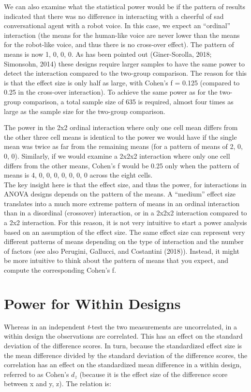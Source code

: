 \documentclass[,man,floatsintext]{apa6}
\begin{document}
We can also examine what the statistical power would be if the pattern
of results indicated that there was no difference in interacting with a
cheerful of sad conversational agent with a robot voice. In this case,
we expect an \enquote{ordinal} interaction (the means for the human-like
voice are never lower than the means for the robot-like voice, and thus
there is no cross-over effect). The pattern of means is now 1, 0, 0, 0.
As has been pointed out (Giner-Sorolla, 2018; Simonsohn, 2014) these
designs require larger samples to have the same power to detect the
interaction compared to the two-group comparison. The reason for this is
that the effect size is only half as large, with Cohen's f = 0.125
(compared to 0.25 in the cross-over interaction). To achieve the same
power as for the two-group comparison, a total sample size of 635 is
required, almost four times as large as the sample size for the
two-group comparison.

The power in the 2x2 ordinal interaction where only one cell mean
differs from the other three cell means is identical to the power we
would have if the single mean was twice as far from the remaining means
(for a pattern of means of 2, 0, 0, 0). Similarly, if we would examine a
2x2x2 interaction where only one cell differs from the other means,
Cohen's f would be 0.25 only when the pattern of means is 4, 0, 0, 0, 0,
0, 0, 0 across the eight cells.\\
The key insight here is that the effect size, and thus the power, for
interactions in ANOVA designs depends on the pattern of the means. A
\enquote{medium} effect size translates into a much more extreme pattern
of means in an ordinal interaction than in a disordinal (crossover)
interaction, or in a 2x2x2 interaction compared to a 2x2 interaction.
For this reason, it is not very intuitive to start a power analysis
based on an assumption of the effect size. The same effect size can
represent very different patterns of means depending on the type of
interaction and the number of factors (see also Perugini, Gallucci, and
Costantini (2018)). Instead, it might be more intuitive to think about
the pattern of means that you expect, and compute the corresponding
Cohen's f.

\section{Power for Within Designs}\label{power-for-within-designs}

Whereas in an independent \emph{t}-test the two measurements are
uncorrelated, in a within design the observations are correlated. This
has an effect on the standard deviation of the difference scores. In
turn, because the standardized effect size is the mean difference
divided by the standard deviation of the difference scores, the
correlation has an effect on the standardized mean difference in a
within design, referred to as Cohen's \(d_z\) (because it is the effect
size of the difference score between x and y, z). The relation is:
\end{document}
